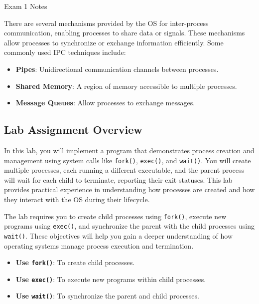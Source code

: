 \begin{examnotes}{Exam 1 Notes}
    \begin{highlight}
        There are several mechanisms provided by the OS for inter-process communication, enabling processes to share data or signals. These mechanisms allow processes to synchronize or exchange information 
        efficiently. Some commonly used IPC techniques include:
        \begin{itemize}
            \item \textbf{Pipes}: Unidirectional communication channels between processes.
            \item \textbf{Shared Memory}: A region of memory accessible to multiple processes.
            \item \textbf{Message Queues}: Allow processes to exchange messages.
        \end{itemize}
    \end{highlight}
    
    \subsection*{Lab Assignment Overview}
    
    In this lab, you will implement a program that demonstrates process creation and management using system calls like \texttt{fork()}, \texttt{exec()}, and \texttt{wait()}. You will create multiple 
    processes, each running a different executable, and the parent process will wait for each child to terminate, reporting their exit statuses. This lab provides practical experience in understanding 
    how processes are created and how they interact with the OS during their lifecycle.
    
    \begin{highlight}
        The lab requires you to create child processes using \texttt{fork()}, execute new programs using \texttt{exec()}, and synchronize the parent with the child processes using \texttt{wait()}. 
        These objectives will help you gain a deeper understanding of how operating systems manage process execution and termination.
        \begin{itemize}
            \item \textbf{Use \texttt{fork()}}: To create child processes.
            \item \textbf{Use \texttt{exec()}}: To execute new programs within child processes.
            \item \textbf{Use \texttt{wait()}}: To synchronize the parent and child processes.
        \end{itemize}
    \end{highlight}
    

\end{examnotes}
